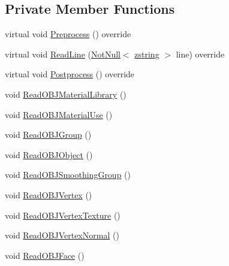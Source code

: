 \subsection*{Private Member Functions}
\begin{DoxyCompactItemize}
\item 
virtual void \mbox{\hyperlink{classmage_1_1rendering_1_1loader_1_1_o_b_j_reader_ad082a6295259f7e8af2c60c182ea55d3}{Preprocess}} () override
\item 
virtual void \mbox{\hyperlink{classmage_1_1rendering_1_1loader_1_1_o_b_j_reader_a6552753d2295585283df035732f38dbd}{Read\+Line}} (\mbox{\hyperlink{namespacemage_a8769f9d670d6b585ea306cb1062af94b}{Not\+Null}}$<$ \mbox{\hyperlink{namespacemage_a4163ec9a9a27d5e7f4b452dcb99cb2b9}{zstring}} $>$ line) override
\item 
virtual void \mbox{\hyperlink{classmage_1_1rendering_1_1loader_1_1_o_b_j_reader_a281c16ef7d20a7c1416923f3cadee33a}{Postprocess}} () override
\item 
void \mbox{\hyperlink{classmage_1_1rendering_1_1loader_1_1_o_b_j_reader_aa898eb5cac6a5e04b1da9329587a81cd}{Read\+O\+B\+J\+Material\+Library}} ()
\item 
void \mbox{\hyperlink{classmage_1_1rendering_1_1loader_1_1_o_b_j_reader_a5aa719224a08175bcbcb26873e2fb5e1}{Read\+O\+B\+J\+Material\+Use}} ()
\item 
void \mbox{\hyperlink{classmage_1_1rendering_1_1loader_1_1_o_b_j_reader_a4e733a0afea4b82e3aea89fe58f5bfba}{Read\+O\+B\+J\+Group}} ()
\item 
void \mbox{\hyperlink{classmage_1_1rendering_1_1loader_1_1_o_b_j_reader_a519f333ce13777d469c63eae7ab8dcf4}{Read\+O\+B\+J\+Object}} ()
\item 
void \mbox{\hyperlink{classmage_1_1rendering_1_1loader_1_1_o_b_j_reader_ac7f3807cf0a0ae24b340cb8208c5b2ef}{Read\+O\+B\+J\+Smoothing\+Group}} ()
\item 
void \mbox{\hyperlink{classmage_1_1rendering_1_1loader_1_1_o_b_j_reader_a0f6e0d744b2baf94bca4dfda6c2cc194}{Read\+O\+B\+J\+Vertex}} ()
\item 
void \mbox{\hyperlink{classmage_1_1rendering_1_1loader_1_1_o_b_j_reader_a91f53fd761c83c4135a3ef1882b8300d}{Read\+O\+B\+J\+Vertex\+Texture}} ()
\item 
void \mbox{\hyperlink{classmage_1_1rendering_1_1loader_1_1_o_b_j_reader_a1aafeda3894017fb9b3c6183ac272a34}{Read\+O\+B\+J\+Vertex\+Normal}} ()
\item 
void \mbox{\hyperlink{classmage_1_1rendering_1_1loader_1_1_o_b_j_reader_a58d5c4e4a5a82714567413b6e17a9ec7}{Read\+O\+B\+J\+Face}} ()

\end{DoxyCompactItemize}
